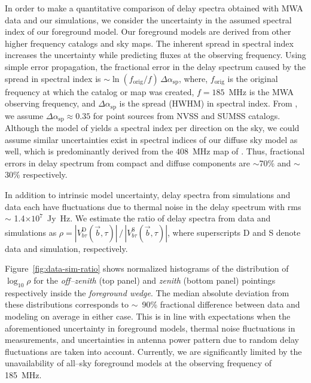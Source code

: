 \documentclass[preprint2,iop,numberedappendix]{emulateapj}
\begin{document}
In order to make a quantitative comparison of delay spectra obtained with MWA data and our simulations, we consider the uncertainty in the assumed spectral index of our foreground model. Our foreground models are derived from other higher frequency catalogs and sky maps. The inherent spread in spectral index increases the uncertainty while predicting fluxes at the observing frequency. Using simple error propagation, the fractional error in the delay spectrum caused by the spread in spectral index is $\sim \ln(f_\textrm{orig}/f)\,\Delta\alpha_\textrm{sp}$, where, $f_\textrm{orig}$ is the original frequency at which the catalog or map was created, $f=185$~MHz is the MWA observing frequency, and $\Delta\alpha_\textrm{sp}$ is the spread (HWHM) in spectral index. From \citet{mau03}, we assume $\Delta\alpha_\textrm{sp} \approx 0.35$ for point sources from NVSS and SUMSS catalogs. Although the model of \citet{deo08} yields a spectral index per direction on the sky, we could assume similar uncertainties exist in spectral indices of our diffuse sky model as well, which is predominantly derived from the 408~MHz map of \citet{has82}. Thus, fractional errors in delay spectrum from compact and diffuse components are $\sim$70\% and $\sim$30\% respectively. 

In addition to intrinsic model uncertainty, delay spectra from simulations and data each have fluctuations due to thermal noise in the delay spectrum with rms $\sim$ 1.4$\times 10^7$~Jy~Hz. We estimate the ratio of delay spectra from data and simulations as $\rho = |V^\textrm{D}_{b\tau}(\vec{b},\tau)|\,/\,|V^\textrm{S}_{b\tau}(\vec{b},\tau)|$, where superscripts D and S denote data and simulation, respectively. %

Figure~\ref{fig:data-sim-ratio} shows normalized histograms of the distribution of $\log_{10}\rho$ for the {\it off--zenith} (top panel) and {\it zenith} (bottom panel) pointings respectively inside the {\it foreground wedge}. The median absolute deviation from these distributions corresponds to $\sim$~90\% fractional difference between data and modeling on average in either case. This is in line with expectations when the aforementioned uncertainty in foreground models, thermal noise fluctuations in measurements, and uncertainties in antenna power pattern due to random delay fluctuations are taken into account. Currently, we are significantly limited by the unavailability of all--sky foreground models at the observing frequency of 185~MHz. 
\end{document}
